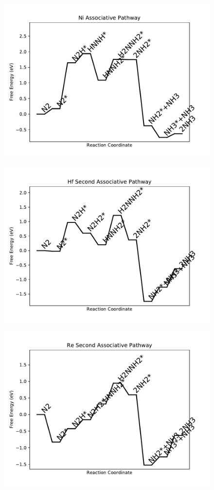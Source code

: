 \begin{figure}
\includegraphics[width=0.8\linewidth]{data/plots/Ni_associative.pdf}
\label{fig:Ni_associative}
\end{figure}

\begin{figure}
\includegraphics[width=0.8\linewidth]{data/plots/Hf_associative_2.pdf}
\label{fig:Hf_associative_2}
\end{figure}

\begin{figure}
\includegraphics[width=0.8\linewidth]{data/plots/Re_associative_2.pdf}
\label{fig:Re_associative_2}
\end{figure}

